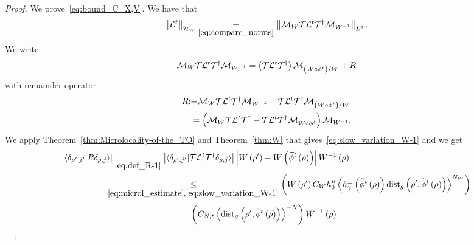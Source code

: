 \documentclass[AHL,Unicode,longabstracts,published]{cedram}
\newcommand{\clT}{\mathcal{T}}
\newcommand{\clH}{\mathcal{H}}
\newcommand{\clL}{\mathcal{L}}
\newcommand{\clM}{\mathcal{M}}
\newcommand{\dist}{\mathrm{dist}}
\let\oldtilde\tilde
\renewcommand*{\tilde}[1]{\mathchoice{\widetilde{#1}}{\widetilde{#1}}{\oldtilde{#1}}{\oldtilde{#1}}}
\newcommand{\clH}{\mathcal{H}}
\begin{document}
\begin{proof}
We prove~\eqref{eq:bound_C_X,V}. We have that
\[
\left\Vert \clL^{t}\right\Vert _{\clH _{W}}\underset{\eqref{eq:compare_norms}}{=}\left\Vert \clM_{W}\text{\ensuremath{\clT}\ensuremath{\clL^{t}}\ensuremath{\clT^{\dagger}}}\clM_{W^{-1}}\right\Vert _{L^{2}}.
\]
We write
\begin{equation}\label{eq:decomp}
\clM_{W}\text{\ensuremath{\clT}\ensuremath{\clL^{t}}\ensuremath{\clT^{\dagger}}}\clM_{W^{-1}}=\left(\ensuremath{\clT}\ensuremath{\clL^{t}}\ensuremath{\clT^{\dagger}}\right)\clM_{\left(W\circ\tilde{\phi}^{t}\right)/W}+R
\end{equation}
with remainder operator
\begin{equation}\label{eq:def_R-1}
\begin{split}
R & {:=}\clM_{W}\text{\ensuremath{\clT}\ensuremath{\clL^{t}}\ensuremath{\clT^{\dagger}}}\clM_{W^{-1}}-\text{\ensuremath{\clT}\ensuremath{\clL^{t}}\ensuremath{\clT^{\dagger}}}\clM_{\left(W\circ\tilde{\phi}^{t}\right)/W}
\\
& \;=\left(\clM_{W}\text{\ensuremath{\clT}\ensuremath{\clL^{t}}\ensuremath{\clT^{\dagger}}}-\text{\ensuremath{\clT}\ensuremath{\clL^{t}}\ensuremath{\clT^{\dagger}}}\clM_{W\circ\tilde{\phi}^{t}}\right)\clM_{W^{-1}}.
\end{split}
\end{equation}
We apply Theorem~\ref{thm:Microlocality-of-the_TO} and Theorem~\ref{thm:W} that gives~\eqref{eq:slow_variation_W-1} and we get
\begin{equation}
\begin{split} 
\left|\langle\delta_{\rho',j'}|R\delta_{\rho,j}\rangle\right|&\underset{\eqref{eq:def_R-1}}{=} \left|\langle\delta_{\rho',j'}|\text{\ensuremath{\clT}\ensuremath{\clL^{t}}\ensuremath{\clT^{\dagger}}}\delta_{\rho,j}\rangle\right|\left|W\left(\rho'\right)-W\left(\tilde{\phi}^{t}\left(\rho\right)\right)\right|W^{-1}\left(\rho\right)\\
&\mkern-15mu\underset{\eqref{eq:microl_estimate},\eqref{eq:slow_variation_W-1}}{\leq} \left(W\left(\rho'\right)C_{W}h_{0}^{\mu}\left\langle h_{\gamma}^{\perp}\left(\tilde{\phi}^{t}\left(\rho\right)\right)\dist_{g}\left(\rho',\tilde{\phi}^{t}\left(\rho\right)\right)\right\rangle ^{N_{W}}\right)\\
\end{split}
\end{equation}
\begin{align}
&\mkern-15mu\left(C_{N,t}\left\langle \dist_{g}\left(\rho',\tilde{\phi}^{t}\left(\rho\right)\right)\right\rangle ^{-N}\right)W^{-1}\left(\rho\right)\\

\end{align}
\end{proof}
\end{document}
